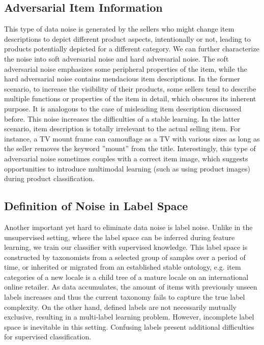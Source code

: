 \documentclass[11pt,dvipsnames]{article}
\begin{document}
\subsection{Adversarial Item Information}
This type of data noise is generated by the sellers who might change item descriptions to depict different product aspects, intentionally or not, leading to products potentially depicted for a different category. We can further characterize the noise into soft adversarial noise and hard adversarial noise. The soft adversarial noise emphasizes some peripheral properties of the item, while the hard adversarial noise contains mendacious item descriptions. In the former scenario, to increase the visibility of their products, some sellers tend to describe multiple functions or properties of the item in detail, which obscures its inherent purpose. It is analogous to the case of misleading item description discussed before. This noise increases the difficulties of a stable learning. In the latter scenario, item description is totally irrelevant to the actual selling item. For instance, a TV mount frame can camouflage as a TV with various sizes as long as the seller removes the keyword ”mount” from the title. Interestingly, this type of adversarial noise sometimes couples with a correct item image, which suggests opportunities to introduce multimodal learning (such as using product images)  during product classification.           

\subsection{Definition of Noise in Label Space}
Another important yet hard to eliminate data noise is label noise. Unlike in the unsupervised setting, where the label space can be inferred during feature learning, we train our classifier with supervised knowledge. This label space is constructed by taxonomists from a selected group of samples over a period of time, or inherited or migrated from an established stable ontology, e.g. item categories of a new locale is a child tree of a mature locale on an international online retailer. As data accumulates, the amount of items with previously unseen labels increases and thus the current taxonomy fails to capture the true label complexity. On the other hand, defined labels are not necessarily mutually exclusive, resulting in a multi-label learning problem. However, incomplete label space is inevitable in this setting. Confusing labels present additional difficulties for supervised classification. 
\end{document}
